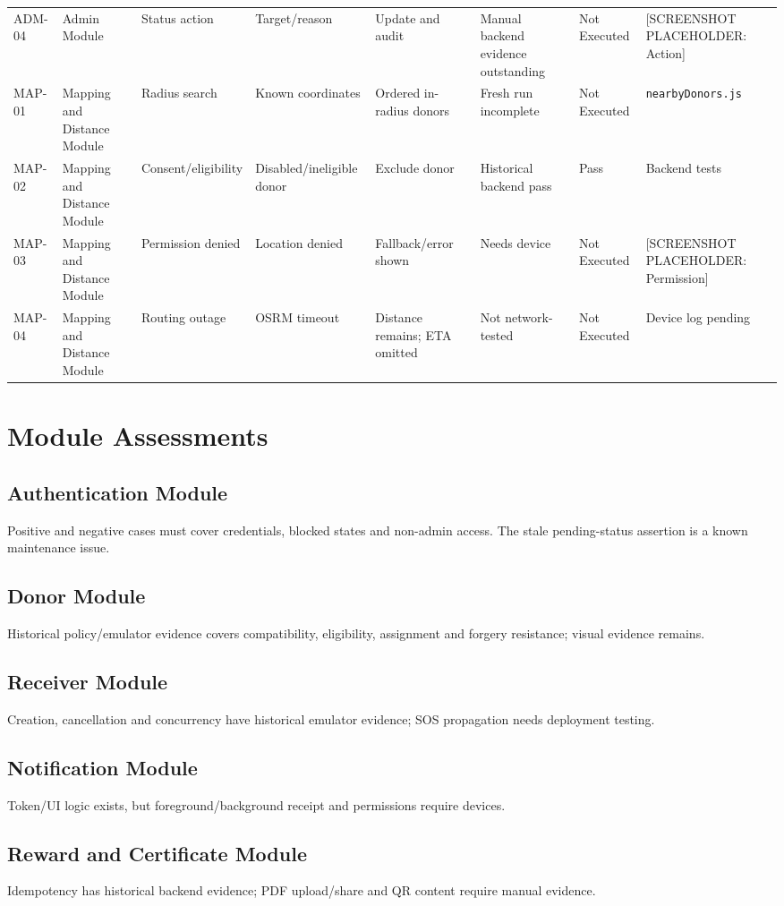 \begin{landscape}
\begin{longtable}{p{1.2cm}p{2.2cm}p{3cm}p{2.5cm}p{3.3cm}p{3.2cm}p{1.6cm}p{3cm}}
ADM-04&Admin Module&Status action&Target/reason&Update and audit&Manual backend evidence outstanding&Not Executed&[SCREENSHOT PLACEHOLDER: Action]\\
MAP-01&Mapping and Distance Module&Radius search&Known coordinates&Ordered in-radius donors&Fresh run incomplete&Not Executed&\texttt{nearbyDonors.js}\\
MAP-02&Mapping and Distance Module&Consent/eligibility&Disabled/ineligible donor&Exclude donor&Historical backend pass&Pass&Backend tests\\
MAP-03&Mapping and Distance Module&Permission denied&Location denied&Fallback/error shown&Needs device&Not Executed&[SCREENSHOT PLACEHOLDER: Permission]\\
MAP-04&Mapping and Distance Module&Routing outage&OSRM timeout&Distance remains; ETA omitted&Not network-tested&Not Executed&Device log pending\\
\bottomrule\end{longtable}\end{landscape}
\section{Module Assessments}
\subsection{Authentication Module} Positive and negative cases must cover credentials, blocked states and non-admin access. The stale pending-status assertion is a known maintenance issue.
\subsection{Donor Module} Historical policy/emulator evidence covers compatibility, eligibility, assignment and forgery resistance; visual evidence remains.
\subsection{Receiver Module} Creation, cancellation and concurrency have historical emulator evidence; SOS propagation needs deployment testing.
\subsection{Notification Module} Token/UI logic exists, but foreground/background receipt and permissions require devices.
\subsection{Reward and Certificate Module} Idempotency has historical backend evidence; PDF upload/share and QR content require manual evidence.
